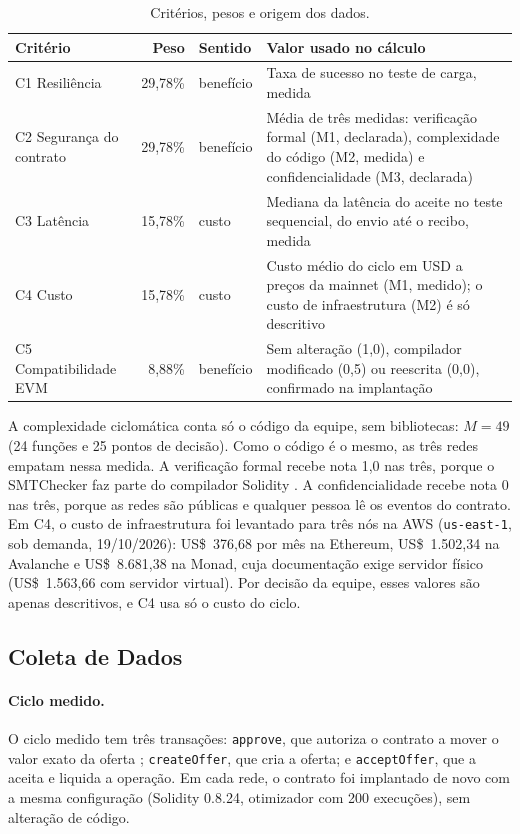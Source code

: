 \documentclass[10pt,a4paper]{article}
\newcommand{\fn}[1]{\texttt{#1}}
\begin{document}
\begin{table}[ht]
\centering
\caption{Critérios, pesos e origem dos dados.}\label{tab:criterios}
\small
\begin{tabularx}{\linewidth}{@{}lrlX@{}}
\toprule
Critério & Peso & Sentido & Valor usado no cálculo \\
\midrule
C1 Resiliência & 29,78\% & benefício & Taxa de sucesso no teste de carga, medida \\
C2 Segurança do contrato & 29,78\% & benefício & Média de três medidas: verificação formal (M1, declarada), complexidade do código (M2, medida) e confidencialidade (M3, declarada) \\
C3 Latência & 15,78\% & custo & Mediana da latência do aceite no teste sequencial, do envio até o recibo, medida \\
C4 Custo & 15,78\% & custo & Custo médio do ciclo em USD a preços da mainnet (M1, medido); o custo de infraestrutura (M2) é só descritivo \\
C5 Compatibilidade EVM & 8,88\% & benefício & Sem alteração (1,0), compilador modificado (0,5) ou reescrita (0,0), confirmado na implantação \\
\bottomrule
\end{tabularx}
\end{table}

A complexidade ciclomática \cite{mccabe1976} conta só o código da equipe, sem bibliotecas: $M = 49$ (24 funções e 25 pontos de decisão). Como o código é o mesmo, as três redes empatam nessa medida. A verificação formal recebe nota 1,0 nas três, porque o SMTChecker faz parte do compilador Solidity \cite{solidity2024smt}. A confidencialidade recebe nota 0 nas três, porque as redes são públicas e qualquer pessoa lê os eventos do contrato. Em C4, o custo de infraestrutura foi levantado para três nós na AWS (\fn{us-east-1}, sob demanda, 19/10/2026): US\$~376,68 por mês na Ethereum, US\$~1.502,34 na Avalanche e US\$~8.681,38 na Monad, cuja documentação exige servidor físico (US\$~1.563,66 com servidor virtual). Por decisão da equipe, esses valores são apenas descritivos, e C4 usa só o custo do ciclo.

\subsection{Coleta de Dados}

\paragraph{Ciclo medido.} O ciclo medido tem três transações: \fn{approve}, que autoriza o contrato a mover o valor exato da oferta \cite{eip20}; \fn{createOffer}, que cria a oferta; e \fn{acceptOffer}, que a aceita e liquida a operação. Em cada rede, o contrato foi implantado de novo com a mesma configuração (Solidity 0.8.24, otimizador com 200 execuções), sem alteração de código.
\end{document}
